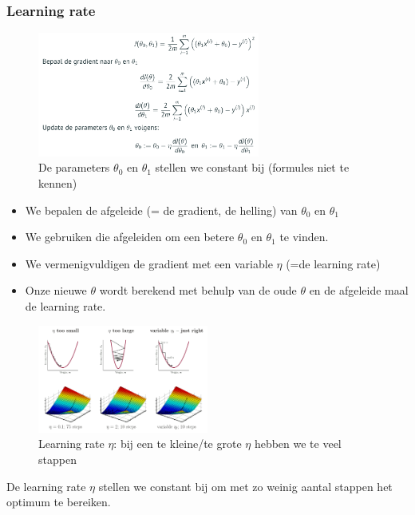 \documentclass{article}
\begin{document}
\subsubsection{Learning rate}

\begin{figure}[H]
    \centering
    \includegraphics[width=0.65\textwidth]{gradient-descent-afgeleiden.png}
    \caption{De parameters $\theta_0$ en $\theta_1$ stellen we constant bij (formules niet te kennen)}
\end{figure}

\begin{itemize}
    \item We bepalen de afgeleide (= de gradient, de helling) van $\theta_0$ en $\theta_1$
    \item We gebruiken die afgeleiden om een betere $\theta_0$ en $\theta_1$ te vinden.
    \item We vermenigvuldigen de gradient met een variable $\eta$ (=de learning rate)
    \item Onze nieuwe $\theta$ wordt berekend met behulp van de oude $\theta$ en de afgeleide maal de learning rate. 
\end{itemize}

\begin{figure}[H]
    \centering
    \includegraphics[width=0.5\textwidth]{lineaire-regressie-learning-rate.png}
    \caption{Learning rate $\eta$: bij een te kleine/te grote $\eta$ hebben we te veel stappen}
\end{figure}

De learning rate $\eta$ stellen we constant bij om met zo weinig aantal stappen het optimum te bereiken.
\end{document}
